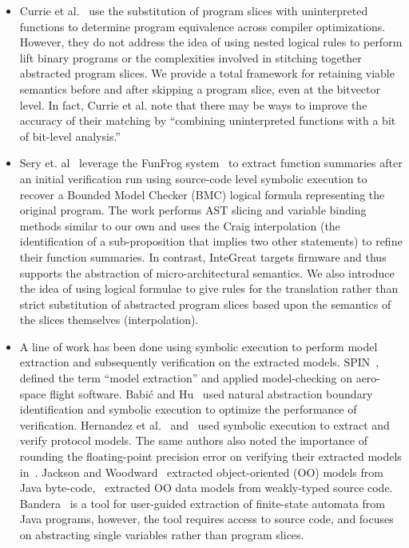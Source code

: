 \begin{itemize}
	\item Currie et al.~\cite{currie2006embedded} use the substitution of program slices with uninterpreted functions to determine program equivalence across compiler optimizations.
	However, they do not address the idea of using nested logical rules to perform lift binary programs or the complexities involved in stitching together abstracted program slices.
	We provide a total framework for retaining viable semantics before and after skipping a program slice, even at the bitvector level.
	In fact, Currie et al. note that there may be ways to improve the accuracy of their matching by ``combining uninterpreted functions with a bit of bit-level analysis.''
	\item Sery et. al~\cite{interpolation} leverage the FunFrog system~\cite{sery2012funfrog} to extract function summaries after an initial verification run using source-code level symbolic execution to recover a Bounded Model Checker (BMC) logical formula representing the original program.
	The work performs AST slicing and variable binding methods similar to our own and uses the Craig interpolation (the identification of a sub-proposition that implies two other statements) to refine their function summaries.
	In contrast, InteGreat targets firmware and thus supports the abstraction of micro-architectural semantics.
	We also introduce the idea of using logical formulae to give rules for the translation rather than strict substitution of abstracted program slices based upon the semantics of the slices themselves (interpolation).
	\item A line of work has been done using symbolic execution to perform model extraction and subsequently verification on the extracted models.
	SPIN~\cite{spin}, defined the term ``model extraction'' and applied model-checking on aero-space flight software.
	Babi\'c and Hu~\cite{babic2007structural} used natural abstraction boundary identification and symbolic execution to optimize the performance of verification.
	Hernandez et al.~\cite{firmusb} and~\cite{cryto-symex} used symbolic execution to extract and verify protocol models.
	The same authors also noted the importance of rounding the floating-point precision error on verifying their extracted models in~\cite{precision}.
	Jackson and Woodward~\cite{lightweight-oo} extracted object-oriented (OO) models from Java byte-code,~\cite{oo-model} extracted OO data models from weakly-typed source code. 
	Bandera~\cite{tool-supported-program-abstraction} is a tool for user-guided extraction of finite-state automata from Java programs, however, the tool requires access to source code, and focuses on abstracting single variables rather than program slices.

\end{itemize}
